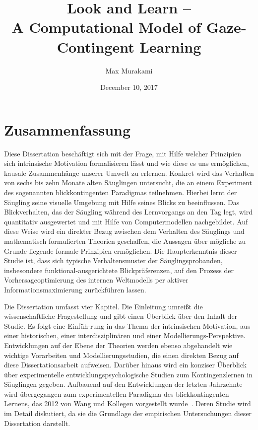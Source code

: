 \documentclass[a4paper]{scrreprt}
\begin{document}



\title{Look and Learn --\\A Computational Model of Gaze-Contingent Learning}
\author{Max Murakami}
\date{December 10, 2017}

\maketitle

\tableofcontents

\chapter*{Zusammenfassung}

Diese Dissertation besch\"aftigt sich mit der Frage, mit Hilfe welcher Prinzipien sich intrinsische Motivation formalisieren l\"asst und wie diese es uns erm\"oglichen, kausale Zusammenh\"ange unserer Umwelt zu erlernen. Konkret wird das Verhalten von sechs bis zehn Monate alten S\"auglingen untersucht, die an einem Experiment des sogenannten blickkontingenten Paradigmas teilnehmen. Hierbei lernt der S\"augling seine visuelle Umgebung mit Hilfe seines Blicks zu beeinflussen. Das Blickverhalten, das der S\"augling w\"ahrend des Lernvorgangs an den Tag legt, wird quantitativ ausgewertet und mit Hilfe von Computermodellen nachgebildet. Auf diese Weise wird ein direkter Bezug zwischen dem Verhalten des S\"auglings und mathematisch formulierten Theorien geschaffen, die Aussagen \"uber m\"ogliche zu Grunde liegende formale Prinzipien erm\"oglichen. Die Haupterkenntnis dieser Studie ist, dass sich typische Verhaltensmuster der S\"auglingsprobanden, insbesondere funktional-ausgerichtete Blickpr\"aferenzen, auf den Prozess der Vorhersageoptimierung des internen Weltmodells per aktiver Informationsmaximierung zur\"uckf\"uhren lassen.

Die Dissertation umfasst vier Kapitel. Die Einleitung umrei\ss t die wissenschaftliche Fragestellung und gibt einen \"Uberblick \"uber den Inhalt der Studie. Es folgt eine Einf\"uh-rung in das Thema der intrinsischen Motivation, aus einer historischen, einer interdisziplin\"aren und einer Modellierungs-Perspektive. Entwicklungen auf der Ebene der Theorien werden ebenso abgehandelt wie wichtige Vorarbeiten und Modellierungsstudien, die einen direkten Bezug auf diese Dissertationsarbeit aufweisen. Dar\"uber hinaus wird ein konziser \"Uberblick \"uber experimentelle entwicklungspsychologische Studien zum Kontingenzlernen in S\"auglingen gegeben. Aufbauend auf den Entwicklungen der letzten Jahrzehnte wird \"ubergegangen zum experimentellen Paradigma des blickkontingenten Lernens, das 2012 von Wang und Kollegen vorgestellt wurde~\cite{wang12}. Deren Studie wird im Detail diskutiert, da sie die Grundlage der empirischen Untersuchungen dieser Dissertation darstellt.
\end{document}

